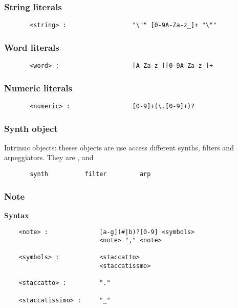 \subsubsection{String literals }
\begin{verbatim}
       <string> :                  "\"" [0-9A-Za-z_]+ "\""
\end{verbatim}
\subsubsection{Word literals }
\begin{verbatim}
       <word> :                    [A-Za-z_][0-9A-Za-z_]+
\end{verbatim}
\subsubsection{Numeric literals }
\begin{verbatim}
       <numeric> :                 [0-9]+(\.[0-9]+)?
\end{verbatim}


\subsubsection{Synth object }

\np Intrinsic objects: theses objects are use access different synths, filters and
arpeggiators. They are ,  and 

\begin{verbatim}
       synth          filter         arp
\end{verbatim}

\subsubsection{Note}

\np \textbf{Syntax}

\begin{verbatim}
    <note> :              [a-g](#|b)?[0-9] <symbols>
                          <note> "," <note>
    
    <symbols> :           <staccatto>
                          <staccatissmo>
    
    <staccatto> :         "."
    
    <staccatissimo> :     "_"

\end{verbatim}


